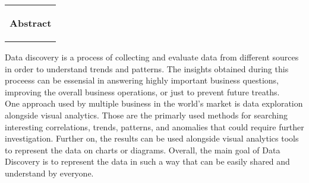 %
  \addtolength{\hoffset}{0.5\evensidemargin-0.5\oddsidemargin} %
  \noindent%
  \begin{tabular}{@{}p{\textwidth}@{}}
    \begin{flushleft}
    \Huge{\textbf{
      Abstract
    }}
    \end{flushleft}
  \end{tabular}
Data discovery is a process of collecting and evaluate data from different sources in order to understand trends and patterns. The insights obtained during this proceess can be essensial in answering highly important business questions, improving the overall business operations, or just to prevent future treaths.
\vspace{2mm} %
\\ One approach used by multiple business in the world's market is data exploration alongside visual analytics. Those are the primarly used methods for searching interesting correlations, trends, patterns, and anomalies that could require further investigation. Further on, the results can be used alongside visual analytics tools to represent the data on charts or diagrams. Overall, the main goal of Data Discovery is to represent the data in such a way that can be easily shared and understand by everyone.



